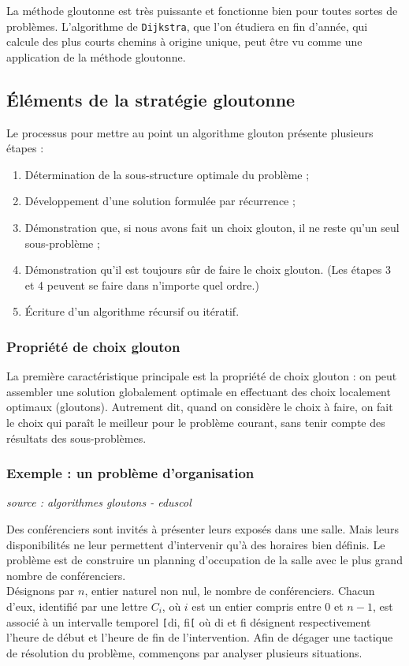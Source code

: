 La méthode gloutonne est très puissante et fonctionne bien pour toutes sortes de problèmes. L'algorithme de \texttt{Dijkstra}, que l'on étudiera en fin d'année, qui calcule des plus courts chemins à origine unique, peut être vu comme une application de la méthode gloutonne.

\subsection{\'Eléments de la stratégie gloutonne}

Le processus pour mettre au point un algorithme glouton présente plusieurs étapes :

\begin{enumerate}
\item Détermination de la sous-structure optimale du problème ;
\item Développement d'une solution formulée par récurrence ;
\item Démonstration que, si nous avons fait un choix glouton, il ne reste qu'un seul sous-problème ;
\item Démonstration qu'il est toujours sûr de faire le choix glouton. (Les étapes 3 et 4 peuvent se faire dans n'importe quel ordre.)
\item \'Ecriture d'un algorithme récursif ou itératif.
\end{enumerate}

\subsubsection{Propriété de choix glouton}

La première caractéristique principale est la propriété de choix glouton : on peut assembler une solution globalement optimale en effectuant des choix localement optimaux (gloutons). Autrement dit, quand on considère le choix à faire, on fait le choix qui paraît le meilleur pour le problème courant, sans tenir compte des résultats des sous-problèmes.


\subsubsection{Exemple : un problème d'organisation}

\textit{source : algorithmes gloutons - eduscol}

Des conférenciers sont invités à présenter leurs exposés dans une salle. Mais leurs disponibilités ne leur permettent d'intervenir qu'à des horaires bien définis. Le problème est de construire un planning d'occupation de la salle avec le plus grand nombre de conférenciers.\\
Désignons par $n$, entier naturel non nul, le nombre de conférenciers. Chacun d'eux, identifié par une lettre $C_i$, où $i$ est un entier compris entre 0 et $n-1$, est associé à un intervalle temporel \verb![!di, fi\verb![! où di et fi désignent respectivement l'heure de début et l'heure de fin de l'intervention. Afin de dégager une tactique de résolution du problème, commençons par analyser plusieurs situations.

